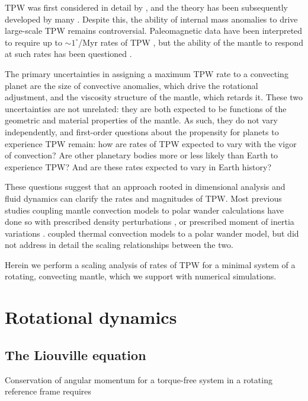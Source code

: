 \documentclass[extra,mreferee]{gji}
\begin{document}
TPW was first considered in detail by \citet{darwin1887influence}, and the theory has been subsequently developed by many \citep[e.g.][]{munk1960rotation, goldreich1969some, ricard1993polar}. 
Despite this, the ability of internal mass anomalies to drive large-scale TPW remains controversial. 
Paleomagnetic data have been interpreted to require up to $\sim 1^\circ$/Myr rates of TPW \citep{mitchell2011sutton}, but the ability of the mantle to respond at such rates has been questioned \citep{tsai2007theoretical}.

The primary uncertainties in assigning a maximum TPW rate to a convecting planet are the size of convective anomalies, which drive the rotational adjustment, and the viscosity structure of the mantle, which retards it. 
These two uncertainties are not unrelated: they are both expected to be functions of the geometric and material properties of the mantle.
As such, they do not vary independently, and first-order questions about the propensity for planets to experience TPW remain: how are rates of TPW expected to vary with the vigor of convection? 
Are other planetary bodies more or less likely than Earth to experience TPW?  And are these rates expected to vary in Earth history?

These questions suggest that an approach rooted in dimensional analysis and fluid dynamics can clarify the rates and magnitudes of TPW.
Most previous studies coupling mantle convection models to polar wander calculations have done so with prescribed density perturbations \citep[e.g.][]{greff2004upwelling}, or prescribed moment of inertia variations \citep[e.g.][]{tsai2007theoretical, creveling2012mechanisms}. 
\citet{richards1999polar} coupled thermal convection models to a polar wander model, but did not address in detail the scaling relationships between the two.

Herein we perform a scaling analysis of rates of TPW for a minimal system of a rotating, convecting mantle,  which we support with numerical simulations.

\section{Rotational dynamics}
\label{sec:rotational_dynamics}

\subsection{The Liouville equation}
\label{sec:liouville}
Conservation of angular momentum for a torque-free system in a rotating reference frame requires
\end{document}
